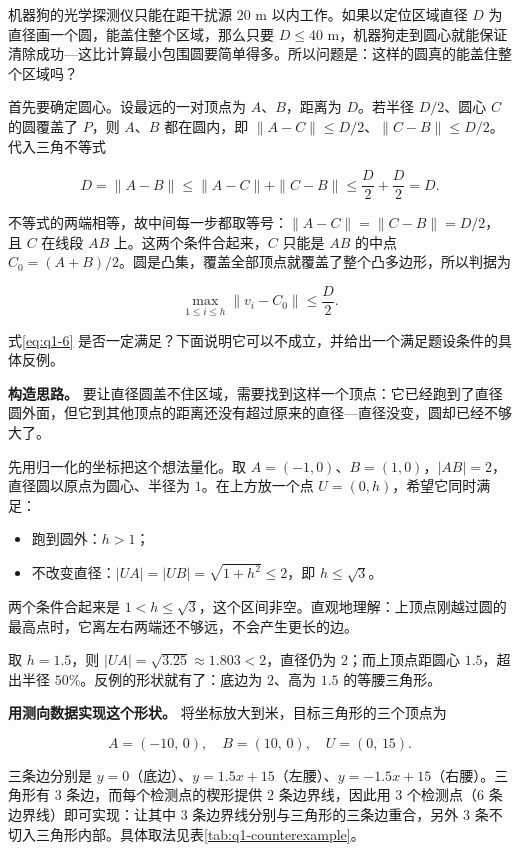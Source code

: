 机器狗的光学探测仪只能在距干扰源 $20$ m 以内工作。如果以定位区域直径 $D$ 为直径画一个圆，能盖住整个区域，那么只要 $D\le40$ m，机器狗走到圆心就能保证清除成功---这比计算最小包围圆要简单得多。所以问题是：这样的圆真的能盖住整个区域吗？

首先要确定圆心。设最远的一对顶点为 $A$、$B$，距离为 $D$。若半径 $D/2$、圆心 $C$ 的圆覆盖了 $P$，则 $A$、$B$ 都在圆内，即 $\|A-C\|\le D/2$、$\|C-B\|\le D/2$。代入三角不等式

\[
D=\|A-B\|\le\|A-C\|+\|C-B\|\le\frac D2+\frac D2=D .
\]

不等式的两端相等，故中间每一步都取等号：$\|A-C\|=\|C-B\|=D/2$，且 $C$ 在线段 $AB$ 上。这两个条件合起来，$C$ 只能是 $AB$ 的中点 $C_0=(A+B)/2$。圆是凸集，覆盖全部顶点就覆盖了整个凸多边形，所以判据为

\begin{equation}\label{eq:q1-6}
\max_{1\le i\le h}\|v_i-C_0\|\le\frac D2 .
\end{equation}

式\eqref{eq:q1-6} 是否一定满足？下面说明它可以不成立，并给出一个满足题设条件的具体反例。

\textbf{构造思路。} 要让直径圆盖不住区域，需要找到这样一个顶点：它已经跑到了直径圆外面，但它到其他顶点的距离还没有超过原来的直径---直径没变，圆却已经不够大了。

先用归一化的坐标把这个想法量化。取 $A=(-1,0)$、$B=(1,0)$，$|AB|=2$，直径圆以原点为圆心、半径为 $1$。在上方放一个点 $U=(0,h)$，希望它同时满足：

\begin{itemize}
\item 跑到圆外：$h>1$；
\item 不改变直径：$|UA|=|UB|=\sqrt{1+h^2}\le2$，即 $h\le\sqrt{3}$。
\end{itemize}

两个条件合起来是 $1<h\le\sqrt{3}$，这个区间非空。直观地理解：上顶点刚越过圆的最高点时，它离左右两端还不够远，不会产生更长的边。

取 $h=1.5$，则 $|UA|=\sqrt{3.25}\approx1.803<2$，直径仍为 $2$；而上顶点距圆心 $1.5$，超出半径 $50\%$。反例的形状就有了：底边为 $2$、高为 $1.5$ 的等腰三角形。

\textbf{用测向数据实现这个形状。} 将坐标放大到米，目标三角形的三个顶点为

\[
A=(-10,\,0),\quad B=(10,\,0),\quad U=(0,\,15).
\]

三条边分别是 $y=0$（底边）、$y=1.5x+15$（左腰）、$y=-1.5x+15$（右腰）。三角形有 $3$ 条边，而每个检测点的楔形提供 $2$ 条边界线，因此用 $3$ 个检测点（$6$ 条边界线）即可实现：让其中 $3$ 条边界线分别与三角形的三条边重合，另外 $3$ 条不切入三角形内部。具体取法见表\ref{tab:q1-counterexample}。

